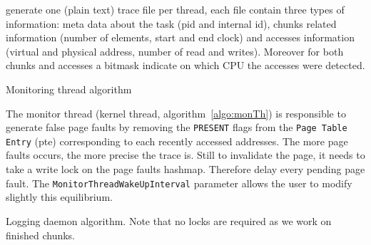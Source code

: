 \Moca generate one (plain text) trace file per thread, each file contain three
types of information: meta data about the task (pid and \Moca internal id),
chunks related information (number of elements, start and end
clock) and accesses information (virtual and physical address, number of read
and writes). Moreover for both chunks and accesses a bitmask indicate on which
CPU the accesses were detected.

\begin{algorithm}[htb]
    \caption{Monitoring thread algorithm}
    \label{algo:monTh}
    \begin{algorithmic}[1]
                \State {}
                        \State {}
                        \State {}
                        \State {}
                    \EndFor
                \State {}
            \EndFor
            \State {}
        \EndWhile
    \end{algorithmic}
\end{algorithm}

The monitor thread (kernel thread, algorithm~\ref{algo:monTh}) is
responsible to generate false page faults by removing the \texttt{PRESENT}
flags from the \texttt{Page Table Entry} (pte) corresponding to each recently
accessed addresses. The more page faults occurs, the more
precise the trace is. Still to invalidate the page, it needs
to take a write lock on the page faults hashmap. Therefore
delay every pending page fault. The
\texttt{MonitorThreadWakeUpInterval} parameter allows the user
to modify slightly this equilibrium.

\begin{algorithm}[htb]
    \caption{Logging daemon algorithm. Note that no locks are required as we
    work on finished chunks.}
    \label{algo:flushTh}
    \begin{algorithmic}[1]
                \State {}
                \State {}
                \EndFor
            \EndFor
            \State {}
        \EndWhile
    \end{algorithmic}
\end{algorithm}

